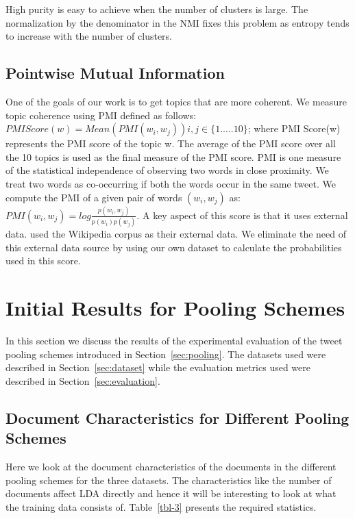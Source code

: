\documentclass[10pt,a5paper,twoside]{article}
\begin{document}
High purity is easy to achieve when the number of clusters is
large. The normalization by the denominator in the NMI fixes this
problem as entropy tends to increase with the number of clusters.

\subsection{Pointwise Mutual Information}

One of the goals of our work is to get topics that are more coherent. 
We measure topic coherence using PMI defined as follows:
$PMI Score(w) = Mean ( PMI(w_i,w_j) )  i,j \in \lbrace1.....10\rbrace $;
where PMI Score(w) represents the PMI score of the topic w. The average of the PMI score over all the 10 topics is used as the final measure of the PMI score. PMI is one measure of the statistical independence of observing two words in
close proximity. We treat two words as co-occurring if both the words occur in the same tweet. We compute the PMI of a given pair of words $(w_i, w_j)$ as:
$PMI (w_i,w_j) = log \frac{p(w_i,w_j)}{p(w_i)p(w_j)}$. 
A key aspect of this score is that it uses external data.  \cite{baldwin10} used the Wikipedia corpus as their external data. We eliminate the need of this external data source by using our own dataset to calculate the probabilities used in this score.

\section{Initial Results for Pooling Schemes}

In this section we discuss the results of the experimental evaluation
of the tweet pooling schemes introduced in
Section~\ref{sec:pooling}. The datasets used were described in
Section~\ref{sec:dataset} while the evaluation metrics used were
described in Section~\ref{sec:evaluation}.

\label{sec:init_results}

\subsection{Document Characteristics for Different Pooling Schemes}

Here we look at the document characteristics of the documents in the
different pooling schemes for the three datasets. The characteristics
like the number of documents affect LDA directly and hence it will be
interesting to look at what the training data consists
of. Table~\ref{tbl-3} presents the required statistics.
\end{document}
